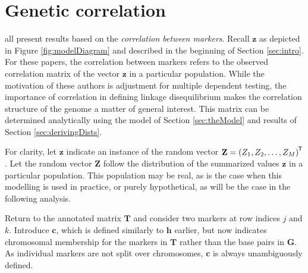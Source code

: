 \documentclass[12pt]{article}
\newcommand{\ve}[1]{\mathbf{#1}}           %
\newcommand{\m}[1]{\mathbf{#1}}               %
\newcommand{\tr}[1]{{#1}^{\mkern-1.5mu\mathsf{T}}}              %
\begin{document}
\section{Genetic correlation} \label{sec:correlation}

\cite{cheverud2001, LiJi2005, Galwey2009} all present results based on the \emph{correlation between markers}. Recall $\ve{z}$ as depicted in Figure \ref{fig:modelDiagram} and described in the beginning of Section \ref{sec:intro}. For these papers, the correlation between markers refers to the observed correlation matrix of the vector $\ve{z}$ in a particular population. While the motivation of these authors is adjustment for multiple dependent testing, the importance of correlation in defining linkage disequilibrium makes the correlation structure of the genome a matter of general interest. This matrix can be determined analytically using the model of Section \ref{sec:theModel} and results of Section \ref{sec:derivingDists}.

For clarity, let $\ve{z}$ indicate an instance of the random vector $\ve{Z} = \tr{(Z_1, Z_2, \dots, Z_M)}$. Let the random vector $\ve{Z}$ follow the distribution of the summarized values $\ve{z}$ in a particular population. This population may be real, as is the case when this modelling is used in practice, or purely hypothetical, as will be the case in the following analysis.

Return to the annotated matrix $\m{T}$ and consider two markers at row indices $j$ and $k$. Introduce $\ve{c}$, which is defined similarly to $\ve{h}$ earlier, but now indicates chromosomal membership for the markers in $\m{T}$ rather than the base pairs in $\m{G}$. As individual markers are not split over chromosomes, $\ve{c}$ is always unambiguously defined.
\end{document}
